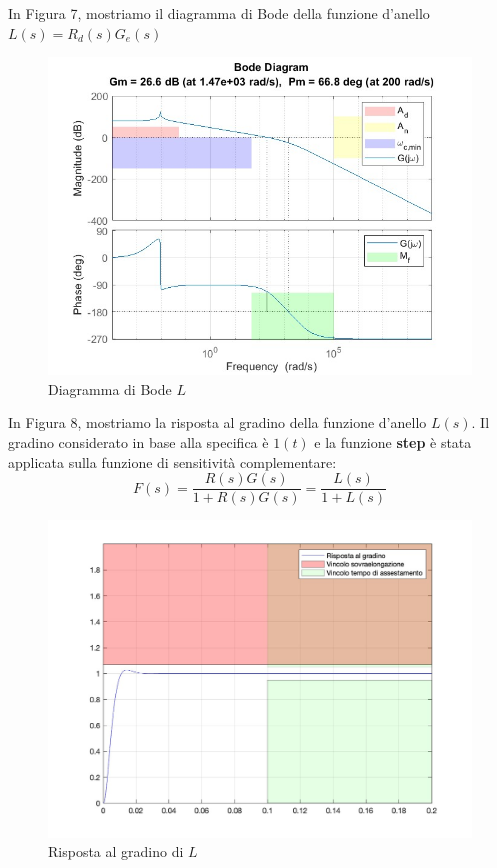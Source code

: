 \documentclass[a4paper, 11pt]{article}
\begin{document}
\vspace{1cm}

In Figura 7, mostriamo il diagramma di Bode della funzione d'anello $L(s) = R_d(s) G_e(s)$

\begin{figure} [!h]
    \centering
    \includegraphics[scale = 0.7]{Immagini/BODE/bode_L.jpg}
    \caption{Diagramma di Bode $L$}
    \label{fig:enter-label}
\end{figure}

\vspace{4 cm}

In Figura 8, mostriamo la risposta al gradino della funzione d'anello $L(s)$. Il gradino considerato in base alla specifica è $1(t)$ e la funzione \textbf{step} è stata applicata sulla funzione di sensitività complementare: $$F(s) = \frac{R(s)G(s)}{1+R(s)G(s)} = \frac{L(s)}{1+L(s)}$$

\begin{figure} [!h]
    \centering
    \includegraphics[scale = 0.4]{Immagini/Step_1.jpg}
    \caption{Risposta al gradino di $L$}
    \label{fig:enter-label}
\end{figure}
\end{document}
